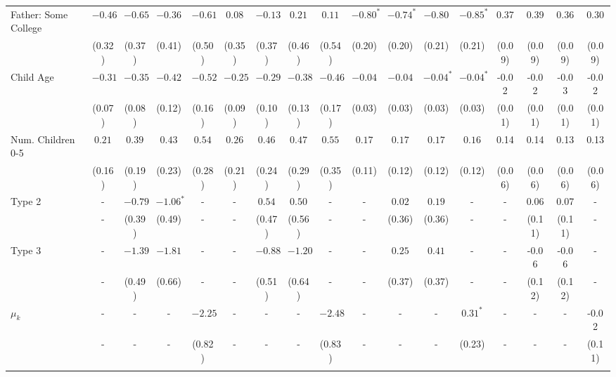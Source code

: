 \begin{tabular}{lcccccccccccccccc}
Father: Some College&$-0.46$&$-0.65$&$-0.36$&$-0.61$&$0.08$&$-0.13$&$0.21$&$0.11$&$-0.80^{*}$&$-0.74^{*}$&$-0.80$&$-0.85^{*}$&0.37&0.39&0.36&0.30\\
&(0.32)&(0.37)&(0.41)&(0.50)&(0.35)&(0.37)&(0.46)&(0.54)&(0.20)&(0.20)&(0.21)&(0.21)&(0.09)&(0.09)&(0.09)&(0.09)\\
Child Age&$-0.31$&$-0.35$&$-0.42$&$-0.52$&$-0.25$&$-0.29$&$-0.38$&$-0.46$&$-0.04$&$-0.04$&$-0.04^{*}$&$-0.04^{*}$&-0.02&-0.02&-0.03&-0.02\\
&(0.07)&(0.08)&(0.12)&(0.16)&(0.09)&(0.10)&(0.13)&(0.17)&(0.03)&(0.03)&(0.03)&(0.03)&(0.01)&(0.01)&(0.01)&(0.01)\\
Num. Children 0-5&$0.21$&$0.39$&$0.43$&$0.54$&$0.26$&$0.46$&$0.47$&$0.55$&$0.17$&$0.17$&$0.17$&$0.16$&0.14&0.14&0.13&0.13\\
&(0.16)&(0.19)&(0.23)&(0.28)&(0.21)&(0.24)&(0.29)&(0.35)&(0.11)&(0.12)&(0.12)&(0.12)&(0.06)&(0.06)&(0.06)&(0.06)\\
Type 2&-&$-0.79$&$-1.06^{*}$&-&-&$0.54$&$0.50$&-&-&$0.02$&$0.19$&-&-&0.06&0.07&-\\
&-&(0.39)&(0.49)&-&-&(0.47)&(0.56)&-&-&(0.36)&(0.36)&-&-&(0.11)&(0.11)&-\\
Type 3&-&$-1.39$&$-1.81$&-&-&$-0.88$&$-1.20$&-&-&$0.25$&$0.41$&-&-&-0.06&-0.06&-\\
&-&(0.49)&(0.66)&-&-&(0.51)&(0.64)&-&-&(0.37)&(0.37)&-&-&(0.12)&(0.12)&-\\
$\mu_{k}$&-&-&-&$-2.25$&-&-&-&$-2.48$&-&-&-&$0.31^{*}$&-&-&-&-0.02\\
&-&-&-&(0.82)&-&-&-&(0.83)&-&-&-&(0.23)&-&-&-&(0.11)\\
\\
\bottomrule\end{tabular}